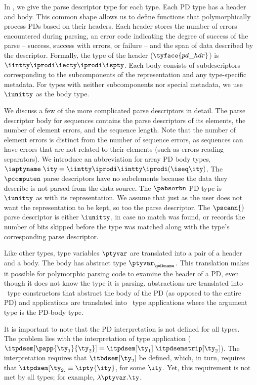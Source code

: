 In , we give the parse descriptor type for each
\ddc{} type. Each PD type has a header and body.  This common shape
allows us to define functions that polymorphically process PDs based
on their headers. Each header stores the number of errors encountered
during parsing, an error code indicating the degree of success of the
parse -- success, success with errors, or failure -- and the span of
data described by the descriptor.  Formally, the type of the header
($\tyface{pd\_hdr}$) is $\iintty \iprodi \iecty \iprodi \ispty$.  Each
body consists of subdescriptors corresponding to the subcomponents of
the representation and any type-specific metadata. For types with
neither subcomponents nor special metadata, we use $\iunitty$ as the
body type.

We discuss a few of the more complicated parse descriptors in detail.
The parse descriptor body for sequences contains the parse descriptors
of its elements, the number of element errors, and the sequence
length. Note that the number of element errors is distinct from the
number of sequence errors, as sequences can have errors that are not
related to their elements (such as errors reading separators).  We
introduce an abbreviation for array PD body types, $\iaptyname \; \ity
= \iintty \iprodi \iintty \iprodi (\iseq \ity)$.  The $\pcomputen$
parse descriptors have no subelements because the data they describe
is not parsed from the data source.  The $\pabsorbn$ PD type is
$\iunitty$ as with its representation. We assume that just as the user
does not want the representation to be kept, so too the parse
descriptor.  The $\pscann{}$ parse descriptor is either $\iunitty$, in
case no match was found, or records the number of bits skipped before
the type was matched along with the type's corresponding parse
descriptor.

Like other types, \ddca{} type variables $\ptyvar$ are translated into
a pair of a header and a body.  The body has abstract type
$\ptyvar_\pdbname$.  This translation makes it possible for
polymorphic parsing code to examine the header of a PD, even though it
does not know the \ddca{} type it is parsing.  \ddca{} abstractions
are translated into \fomega\ type constructors that abstract the body
of the PD (as opposed to the entire PD) and \ddca{} applications are
translated into \fomega\ type applications where the argument type is
the PD-body type. 

It is important to note that the PD interpretation is not defined for
all types. The problem lies with the interpretation of type
application ($\itpdsem[\papp {\ty_1} {\ty_2}] = \itpdsem[\ty_1] \;
\itpdsemstrip[\ty_2]$).  The interpretation requires that $\itbdsem[\ty_2]$ be
defined, which, in turn, requires that $\itpdsem[\ty_2] \equiv
\ipty{\ity}$, for some $\ity$.  Yet, this requirement is not met by
all types; for example, $\lambda \ptyvar.\ty$.

